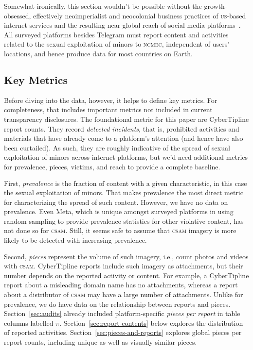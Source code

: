 \documentclass[nonacm,screen]{acmart}
\newcommand\V[1]{\textsc{\MakeLowercase{#1}}}
\begin{document}
\begin{itemize}
{Somewhat ironically, this section wouldn't be possible without the
growth-obsessed, effectively neoimperialist and neocolonial business practices
of \V{US}-based internet services and the resulting near-global reach of social
media platforms~\cite{CouldryMejias2019,ThatcherOSullivanea2016}. All surveyed
platforms besides Telegram must report content and activities related to the
sexual exploitation of minors to \V{NCMEC}, independent of users' locations, and
hence produce data for most countries on Earth.


\subsection{Key Metrics}

Before diving into the data, however, it helps to define key metrics. For
completeness, that includes important metrics not included in current
transparency disclosures. The foundational metric for this paper are
CyberTipline report counts. They record \emph{detected incidents}, that is,
prohibited activities and materials that have already come to a platform's
attention (and hence have also been curtailed). As such, they are roughly
indicative of the spread of sexual exploitation of minors across internet
platforms, but we'd need additional metrics for prevalence, pieces, victims, and
reach to provide a complete baseline.

First, \emph{prevalence} is the fraction of content with a given characteristic,
in this case the sexual exploitation of minors. That makes prevalence the most
direct metric for characterizing the spread of such content. However, we have no
data on prevalence. Even Meta, which is unique amongst surveyed platforms in
using random sampling to provide prevalence statistics for other violative
content, has not done so for \V{CSAM}. Still, it seems safe to assume that
\V{CSAM} imagery is more likely to be detected with increasing prevalence.

Second, \emph{pieces} represent the volume of such imagery, i.e., count photos
and videos with \V{CSAM}. CyberTipline reports include such imagery as
attachments, but their number depends on the reported activity or content. For
example, a CyberTipline report about a misleading domain name has no
attachments, whereas a report about a distributor of \V{CSAM} may have a large
number of attachments. Unlike for prevalence, we do have data on the
relationship between reports and pieces. Section~\ref{sec:audits} already
included platform-specific \emph{pieces per report} in table columns labelled
$\pi$. Section~\ref{sec:report-contents} below explores the distribution of
reported activities. Section~\ref{sec:pieces-and-reports} explores global pieces
per report counts, including unique as well as visually similar pieces.

}
\end{itemize}
\end{document}
